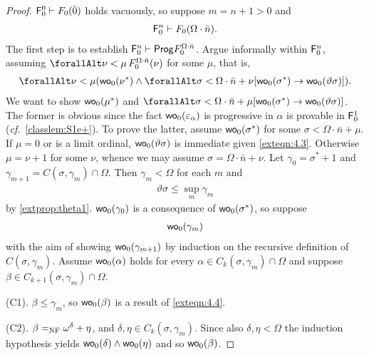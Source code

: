 \documentclass[UKenglish,cleveref,DIV=12]{scrartcl}
\let\forall\forallAlt
\theoremstyle{definition}
\theoremstyle{definition}
\begin{document}
\begin{proof}
$\mathsf{F}_0^0\vdash F_0(\bar0)$ holds vacuously, so suppose $m=n+1>0$ and
\begin{align}\label{exteqn:4.1}
\mathsf{F}_0^n\vdash F_0(\Omega\cdot\bar n).
\end{align}
The first step is to establish
  $\mathsf{F}_0^n\vdash\mathsf{Prog} F^{\Omega\cdot\bar n}_0$.
Argue informally within $\mathsf{F}_0^n$, assuming $\forall\nu<\mu\, F_0^{\Omega\cdot\bar n}(\nu)$ for some $\mu$, that is,
\begin{gather}\label{exteqn:4.3}
  \forall\nu<\mu(\wo_0(\nu^*)\land\forall\sigma<\Omega\cdot\bar n+\nu[\wo_0(\sigma^*)\rightarrow\wo_0(\vartheta\sigma)]).
\end{gather}
We want to show $\mathsf{wo}_0(\mu^*)$ and $\forall\sigma<\Omega\cdot\bar n+\mu[\wo_0(\sigma^*)\rightarrow\wo_0(\vartheta\sigma)]$. The former is obvious since the fact $\mathsf{wo}_0(\varepsilon_\alpha)$ is progressive in $\alpha$ is provable in $\mathsf{F}_0^1$ ({\em cf.}~\cref{classlem:S1e+}). To prove the latter, assume $\mathsf{wo}_0(\sigma^*)$ for some $\sigma<\Omega\cdot\bar n+\mu$. If $\mu=0$ or is
a limit ordinal, $\mathsf{wo}_0(\vartheta\sigma)$ is immediate given \cref{exteqn:4.3}. Otherwise $\mu=\nu+1$
for some $\nu$, whence we may assume $\sigma=\Omega\cdot\bar n+\nu$. Let
$\gamma_0=\sigma^*+1$ and $\gamma_{m+1}=C(\sigma,\gamma_m)\cap\Omega$. Then
$\gamma_m<\Omega$ for each $m$ and
\begin{align*}
  \vartheta \sigma\le\sup_{m}\gamma_m
\end{align*}
by \cref{extprop:theta1}. $\mathsf{wo}_0(\gamma_0)$ is a consequence of
$\mathsf{wo}_0(\sigma^*)$, so suppose
\begin{align}\label{exteqn:4.4}
 \mathsf{wo}_0(\gamma_m)
\end{align}
with the aim of showing $\mathsf{wo}_0(\gamma_{m+1})$ by induction on the recursive
definition of $C(\sigma,\gamma_m)$. Assume $\mathsf{wo}_0(\alpha)$ holds for every
$\alpha\in C_{k}(\sigma,\gamma_m)\cap\Omega$ and suppose $\beta\in
C_{k+1}(\sigma,\gamma_m)\cap\Omega$.

(C1). $\beta\le\gamma_m$, so $\mathsf{wo}_0(\beta)$ is a result of \cref{exteqn:4.4}.

(C2). $\beta=_{\mathrm{NF}}\omega^\delta+\eta$, and $\delta,\eta\in C_k(\sigma,\gamma_m)$.
Since also $\delta,\eta<\Omega$ the induction hypothesis yields
$\mathsf{wo}_0(\delta)\land\mathsf{wo}_0(\eta)$ and so $\mathsf{wo}_0(\beta)$.


\end{proof}
\end{document}
